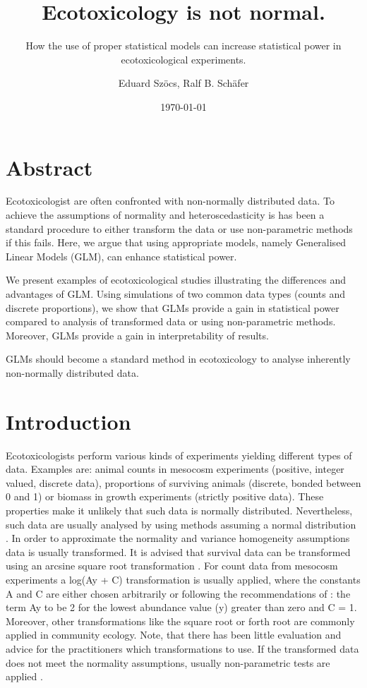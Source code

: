 \documentclass{scrartcl}
\title{Ecotoxicology is not normal.}
\subtitle{How the use of proper statistical models can increase statistical power in ecotoxicological experiments.}
\author{Eduard Szöcs, Ralf B. Schäfer}
\date{\today}
\begin{document}
\maketitle

\section*{Abstract}
Ecotoxicologist are often confronted with non-normally distributed data.
To achieve the assumptions of normality and heteroscedasticity is has been a standard procedure to either transform the data or use non-parametric methods if this fails.
Here, we argue that using appropriate models, namely Generalised Linear Models (GLM), can enhance statistical power.

We present examples of ecotoxicological studies illustrating the differences and advantages of GLM.
Using simulations of two common data types (counts and discrete proportions), we show that GLMs provide a gain in statistical power compared to analysis of transformed data or using non-parametric methods.
Moreover, GLMs provide a gain in interpretability of results.

GLMs should become a standard method in ecotoxicology to analyse inherently non-normally distributed data.




\section{Introduction}
Ecotoxicologists perform various kinds of experiments yielding different types of data.
Examples are: animal counts in mesocosm experiments (positive, integer valued, discrete data), proportions of surviving animals (discrete, bonded between 0 and 1) or biomass in growth experiments (strictly positive data).
These properties make it unlikely that such data is normally distributed. 
Nevertheless, such data are usually analysed by using methods assuming a normal distribution \citep{wang_making_2011}. 
In order to approximate the normality and variance homogeneity assumptions data is usually transformed.
It is advised that survival data can be transformed using an arcsine square root transformation \citep{oecd_current_2006, newman_quantitative_2012}. 
For count data from mesocosm experiments a log(Ay + C) transformation is usually applied, where the constants A and C are either chosen arbitrarily or following the recommendations of \citet{van_den_brink_impact_2000}: the term Ay to be 2 for the lowest abundance value (y) greater than zero and C = 1. 
Moreover, other transformations like the square root or forth root are commonly applied in community ecology.
Note, that there has been little evaluation and advice for the practitioners which transformations to use.
If the transformed data does not meet the normality assumptions, usually non-parametric tests are applied \citep{wang_making_2011}.
\end{document}
